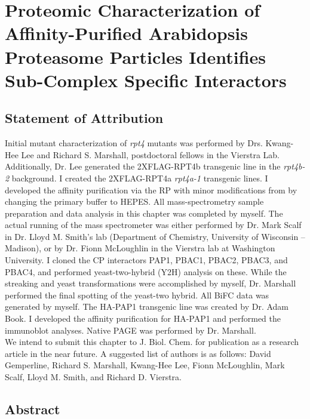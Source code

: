 \chapter{Proteomic Characterization of Affinity-Purified Arabidopsis Proteasome Particles Identifies Sub-Complex Specific Interactors}

\section{Statement of Attribution}
Initial mutant characterization of \textit{rpt4} mutants was performed by Drs. Kwang-Hee Lee and Richard S. Marshall, postdoctoral fellows in the Vierstra Lab. Additionally, Dr. Lee generated the 2XFLAG-RPT4b transgenic line in the \textit{rpt4b-2} background.  I created the 2XFLAG-RPT4a \textit{rpt4a-1} transgenic lines. I developed the affinity purification via the RP with minor modifications from \citep{book10} by changing the primary buffer to HEPES. All mass-spectrometry sample preparation and data analysis in this chapter was completed by myself.  The actual running of the mass spectrometer was either performed by Dr. Mark Scalf in Dr. Lloyd M. Smith’s lab (Department of Chemistry, University of Wisconsin – Madison), or by Dr. Fionn McLoughlin in the Vierstra lab at Washington University.  I cloned the CP interactors PAP1, PBAC1, PBAC2, PBAC3, and PBAC4, and performed yeast-two-hybrid (Y2H) analysis on these.  While the streaking and yeast transformations were accomplished by myself, Dr. Marshall performed the final spotting of the yeast-two hybrid.  All BiFC data was generated by myself.  The HA-PAP1 transgenic line was created by Dr. Adam Book.  I developed the affinity purification for HA-PAP1 and performed the immunoblot analyses.  Native PAGE was performed by Dr. Marshall. \\


\noindent
We intend to submit this chapter to J. Biol. Chem. for publication as a research article in the near future.  A suggested list of authors is as follows: David Gemperline, Richard S. Marshall, Kwang-Hee Lee, Fionn McLoughlin, Mark Scalf, Lloyd M. Smith, and Richard D. Vierstra. 

\section{Abstract}

